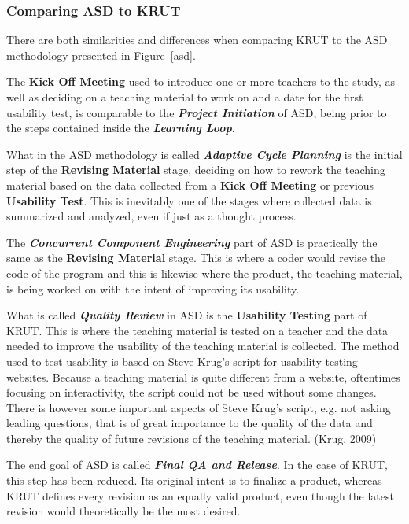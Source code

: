 \subsubsection*{Comparing ASD to KRUT} 
There are both similarities and differences when comparing KRUT to the ASD methodology presented in Figure~\ref{asd}. 

The \textbf{Kick Off Meeting} used to introduce one or more teachers to the study, as well as deciding on a teaching material to work on and a date for the first usability test, is comparable to the \textbf{\textit{Project Initiation}} of ASD, being prior to the steps contained inside the \textbf{\textit{Learning Loop}}.

What in the ASD methodology is called \textbf{\textit{Adaptive Cycle Planning}} is the initial step of the \textbf{Revising Material} stage, deciding on how to rework the teaching material based on the data collected from a \textbf{Kick Off Meeting} or previous \textbf{Usability Test}. This is inevitably one of the stages where collected data is summarized and analyzed, even if just as a thought process.

The \textbf{\textit{Concurrent Component Engineering}} part of ASD is practically the same as the \textbf{Revising Material} stage. This is where a coder would revise the code of the program and this is likewise where the product, the teaching material, is being worked on with the intent of improving its usability.

What is called \textbf{\textit{Quality Review}} in ASD is the \textbf{Usability Testing} part of KRUT. This is where the teaching material is tested on a teacher and the data needed to improve the usability of the teaching material is collected. The method used to test usability is based on Steve Krug’s script for usability testing websites. Because a teaching material is quite different from a website, oftentimes focusing on interactivity, the script could not be used without some changes. There is however some important aspects of Steve Krug’s script, e.g. not asking leading questions, that is of great importance to the quality of the data and thereby the quality of future revisions of the teaching material. (Krug, 2009)

The end goal of ASD is called \textbf{\textit{Final QA and Release}}. In the case of KRUT, this step has been reduced. Its original intent is to finalize a product, whereas KRUT defines every revision as an equally valid product, even though the latest revision would theoretically be the most desired.

